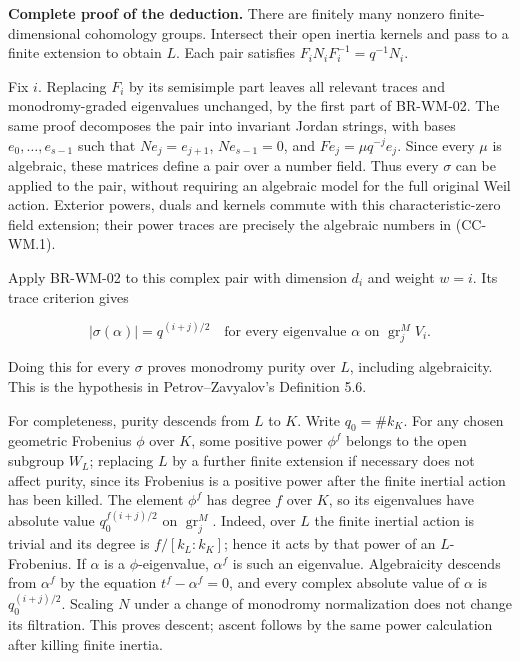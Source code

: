 \textbf{Complete proof of the deduction.} There are finitely many
nonzero finite-dimensional cohomology groups. Intersect their open
inertia kernels and pass to a finite extension to obtain \(L\). Each
pair satisfies \(F_iN_iF_i^{-1}=q^{-1}N_i\).

Fix \(i\). Replacing \(F_i\) by its semisimple part leaves all relevant
traces and monodromy-graded eigenvalues unchanged, by the first part of
BR-WM-02. The same proof decomposes the pair into invariant Jordan
strings, with bases \(e_0,\ldots,e_{s-1}\) such that \(Ne_j=e_{j+1}\),
\(Ne_{s-1}=0\), and \(Fe_j=\mu q^{-j}e_j\). Since every \(\mu\) is
algebraic, these matrices define a pair over a number field. Thus every
\(\sigma\) can be applied to the pair, without requiring an algebraic
model for the full original Weil action. Exterior powers, duals and
kernels commute with this characteristic-zero field extension; their
power traces are precisely the algebraic numbers in (CC-WM.1).

Apply BR-WM-02 to this complex pair with dimension \(d_i\) and weight
\(w=i\). Its trace criterion gives

\[
 |\sigma(\alpha)|=q^{(i+j)/2}
 \quad\text{for every eigenvalue }\alpha
 \text{ on }\operatorname{gr}^M_jV_i.
\]

Doing this for every \(\sigma\) proves monodromy purity over \(L\),
including algebraicity. This is the hypothesis in Petrov--Zavyalov's
Definition 5.6.

For completeness, purity descends from \(L\) to \(K\). Write
\(q_0=\#k_K\). For any chosen geometric Frobenius \(\phi\) over \(K\),
some positive power \(\phi^f\) belongs to the open subgroup \(W_L\);
replacing \(L\) by a further finite extension if necessary does not
affect purity, since its Frobenius is a positive power after the finite
inertial action has been killed. The element \(\phi^f\) has degree \(f\)
over \(K\), so its eigenvalues have absolute value \(q_0^{f(i+j)/2}\) on
\(\operatorname{gr}^M_j\). Indeed, over \(L\) the finite inertial action
is trivial and its degree is \(f/[k_L:k_K]\); hence it acts by that
power of an \(L\)-Frobenius. If \(\alpha\) is a \(\phi\)-eigenvalue,
\(\alpha^f\) is such an eigenvalue. Algebraicity descends from
\(\alpha^f\) by the equation \(t^f-\alpha^f=0\), and every complex
absolute value of \(\alpha\) is \(q_0^{(i+j)/2}\). Scaling \(N\) under a
change of monodromy normalization does not change its filtration. This
proves descent; ascent follows by the same power calculation after
killing finite inertia.

